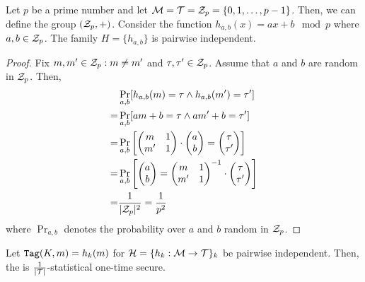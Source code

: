 \begin{theorem}
	Let $p$ be a prime number and let $\mathcal{M} = \mathcal{T} = \mathcal{Z}_p = \{0, 1, \dots, p-1\}$.
	Then, we can define the group $(\mathcal{Z}_p, +)$.
	Consider the function $h_{a,b}(x) = ax + b \mod p$ where $a, b \in \mathcal{Z}_p$.
    The family $H = \{h_{a,b}\}$ is pairwise independent.
\end{theorem}
\begin{proof}
	Fix $m, m' \in \mathcal{Z}_p : m \neq m'$ and $\tau, \tau' \in \mathcal{Z}_p$.
	Assume that $a$ and $b$ are random in $\mathcal{Z}_p$. Then,
    \begin{align*}
        & \Pr_{a,b}[h_{a,b}(m) = \tau \wedge h_{a,b}(m') = \tau'] \\
        = & \Pr_{a,b}[am+b = \tau \wedge am'+b = \tau'] \\
        = & \Pr_{a,b}\left[\begin{pmatrix}
        	m & 1 \\
            m' & 1
        \end{pmatrix} \cdot \begin{pmatrix}
            a \\
            b
        \end{pmatrix} = \begin{pmatrix}
            \tau \\
            \tau'
        \end{pmatrix}\right] \\
        = & \Pr_{a,b}\left[\begin{pmatrix}
            a \\
            b
        \end{pmatrix} = \begin{pmatrix}
            m & 1 \\
            m' & 1
        \end{pmatrix}^{-1} \cdot \begin{pmatrix}
            \tau \\
            \tau'
        \end{pmatrix}\right] \\
        = & \frac{1}{|\mathcal{Z}_p|^2} = \frac{1}{p^2}
    \end{align*}
    where $\Pr_{a,b}$ denotes the probability over $a$ and $b$ random in $\mathcal{Z}_p$.
\end{proof}

\begin{theorem}
    Let $\texttt{Tag}(K,m) = h_k(m)$ for $\mathcal{H} = \{h_k : \mathcal{M} \to \mathcal{T} \}_k$ be pairwise independent. 
    Then, the \Mac{} is $\frac{1}{|\mathcal{T}|}$-statistical one-time secure. 
\end{theorem}

